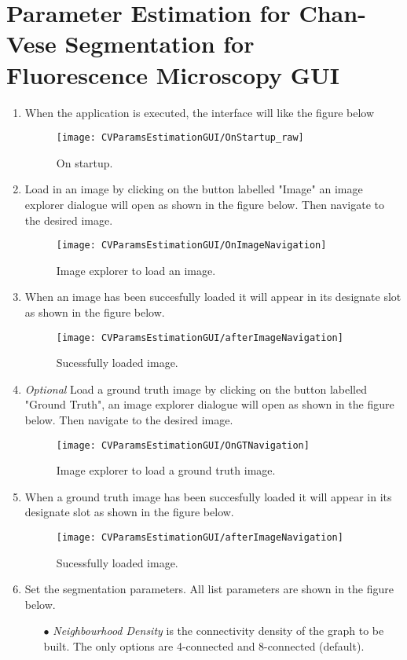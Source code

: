 \documentclass[
11pt, %
a4paper, %
oneside, %
headinclude,footinclude, %
BCOR5mm, %
]{scrartcl}
\begin{document}

\section{Parameter Estimation for Chan-Vese Segmentation for Fluorescence Microscopy GUI}

\begin{enumerate}
\item When the application is executed, the interface will like the figure below
\begin{figure}[h]
\centering\texttt{[image: CVParamsEstimationGUI/OnStartup\_raw]}
\caption{On startup.}
\end{figure}

\item
Load in an image by clicking on the button labelled "Image" an image explorer dialogue will open as shown in the figure below. Then navigate to the desired image.
\begin{figure}[h]
	\centering
	\texttt{[image: CVParamsEstimationGUI/OnImageNavigation]}
	\caption{Image explorer to load an image.}
\end{figure}

\item 
When an image has been succesfully loaded it will appear in its designate slot as shown in the figure below.
\begin{figure}[h]
\centering
\texttt{[image: CVParamsEstimationGUI/afterImageNavigation]}
\caption{Sucessfully loaded image.}
\end{figure}

\item 
\textit{Optional} Load a ground truth image by clicking on the button labelled "Ground Truth", an image explorer dialogue will open as shown in the figure below. Then navigate to the desired image.
\begin{figure}[h]
	\centering
	\texttt{[image: CVParamsEstimationGUI/OnGTNavigation]}
	\caption{Image explorer to load a ground truth image.}
\end{figure}

\item
When a ground truth image has been succesfully loaded it will appear in its designate slot as shown in the figure below.
\begin{figure}[h]
	\centering
	\texttt{[image: CVParamsEstimationGUI/afterImageNavigation]}
	\caption{Sucessfully loaded image.}
\end{figure}
\newpage
\item Set the segmentation parameters. All list parameters are shown in the figure below.
\begin{enumerate}
	\item[$\bullet$]
	\textit{Neighbourhood Density} is the connectivity density of the graph to be built. The only options are 4-connected and 8-connected (default).
	

\end{enumerate}
\end{enumerate}
\end{document}
